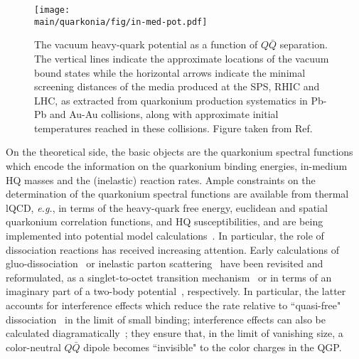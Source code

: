 \documentclass[../report.tex]{subfiles}
\providecommand{\main}{..}
\begin{document}
\begin{figure}[!h]
\begin{center}
\texttt{[image: \\main/quarkonia/fig/in-med-pot.pdf]}
\end{center}
\vspace{-0.5cm}
\caption{The vacuum heavy-quark potential as a function of $Q\bar Q$ separation. The vertical lines indicate the approximate locations of the vacuum bound states while the horizontal arrows indicate the minimal screening distances of the media produced at the SPS, RHIC and LHC, as extracted from quarkonium production systematics in Pb-Pb and Au-Au collisions, along with approximate initial temperatures reached in these collisions. Figure taken from Ref.~\cite{Rapp:2017chc}}
\label{FigQ:pot}
\end{figure}

On the theoretical side, the basic objects are the quarkonium spectral functions which encode the information on the quarkonium binding energies, in-medium HQ masses and the (inelastic) reaction rates.  Ample constraints on the determination of the quarkonium spectral functions are available from thermal lQCD, {\it e.g.}, in terms of the heavy-quark free energy, euclidean and spatial quarkonium correlation functions, and HQ susceptibilities, and are being implemented into potential model calculations~\cite{Wong:2004zr,Mocsy:2005qw,Alberico:2006vw,Brambilla:2008cx,Riek:2010py,Burnier:2015tda,Liu:2017qah}.
In particular, the role of dissociation reactions has received increasing attention. Early calculations of gluo-dissociation~\cite{Bhanot:1979vb,Kharzeev:1994pz} or inelastic parton scattering~\cite{Grandchamp:2001pf} have been revisited and reformulated, \eg as a singlet-to-octet transition mechanism~\cite{Brambilla:2008cx} or in terms of an imaginary part of a two-body potential~\cite{Laine:2006ns}, respectively. In particular, the latter accounts for interference effects which reduce the rate relative to ``quasi-free" dissociation~\cite{Grandchamp:2001pf} in the limit of small binding; interference effects can also be calculated diagramatically~\cite{Park:2007zza}; they ensure that, in the limit of vanishing size, a color-neutral $Q\bar Q$ dipole becomes ``invisible" to the color charges in the QGP.
\end{document}

